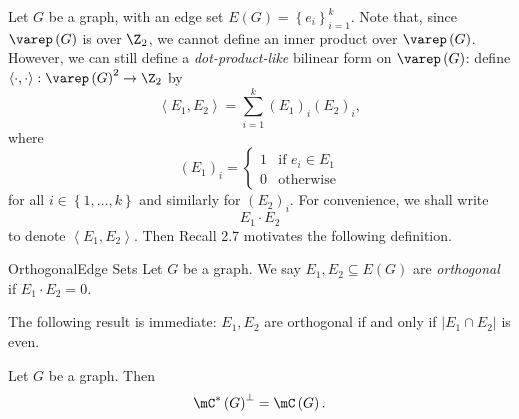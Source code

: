 \documentclass[co342]{subfiles}
\begin{document}
    \np Let $G$ be a graph, with an edge set $E\left( G \right) = \left\lbrace e_i \right\rbrace^{k}_{i=1}$. Note that, since $\varep\left( G \right)$ is over $\Z_2$, we cannot define an inner product over $\varep\left( G \right)$. However, we can still define a \textit{dot-product-like} bilinear form on $\varep\left( G \right)$: define $\left\langle \cdot, \cdot\right\rangle:\varep\left( G \right)^{2}\to\Z_2$ by
    \begin{equation*}
        \left\langle E_1, E_2\right\rangle = \sum^{k}_{i=1} \left( E_1 \right)_i\left( E_2 \right)_i,
    \end{equation*}
    where
    \begin{equation*}
        \left( E_1 \right)_i =
        \begin{cases} 
            1 & \text{if $e_i\in E_1$} \\
            0 & \text{otherwise}
        \end{cases}
    \end{equation*}
    for all $i\in\left\lbrace 1,\ldots,k \right\rbrace$ and similarly for $\left( E_2 \right)_i$. For convenience, we shall write
    \begin{equation*}
        E_1\cdot E_2 
    \end{equation*}
    to denote $\left\langle E_1, E_2\right\rangle$. Then Recall 2.7 motivates the following definition.

    \begin{definition}{Orthogonal}{Edge Sets}
        Let $G$ be a graph. We say $E_1,E_2\subseteq E\left( G \right)$ are \emph{orthogonal} if $E_1\cdot E_2 = 0$.
    \end{definition}

    \noindent The following result is immediate: $E_1,E_2$ are orthogonal if and only if $\left| E_1\cap E_2 \right|$ is even.

    \begin{prop}{}
        Let $G$ be a graph. Then
        \begin{equation*}
            \mC^{*}\left( G \right)^\perp = \mC\left( G \right).
        \end{equation*}
    \end{prop}
\end{document}

